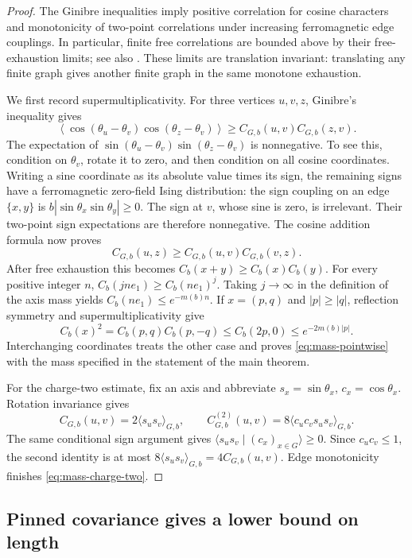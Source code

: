 \begin{proof}
The Ginibre inequalities \cite{Ginibre} imply positive correlation
for cosine characters and monotonicity of two-point correlations
under increasing ferromagnetic edge couplings.  In particular,
finite free correlations are bounded above by their free-exhaustion
limits; see also \cite[Lemma~16]{vEL}.  These limits are translation
invariant: translating any finite graph gives another finite graph
in the same monotone exhaustion.

We first record supermultiplicativity.  For three vertices \(u,v,z\),
Ginibre's inequality gives
\[
 \left\langle
 \cos(\theta_u-\theta_v)\cos(\theta_z-\theta_v)
 \right\rangle
 \ge C_{G,b}(u,v)C_{G,b}(z,v).
\]
The expectation of
\(\sin(\theta_u-\theta_v)\sin(\theta_z-\theta_v)\) is nonnegative.
To see this, condition on \(\theta_v\), rotate it to zero, and then
condition on all cosine coordinates.  Writing a sine coordinate
as its absolute value times its sign, the remaining signs have a
ferromagnetic zero-field Ising distribution: the sign coupling on
an edge \(\{x,y\}\) is
\(b|\sin\theta_x\sin\theta_y|\ge0\).
The sign at \(v\), whose sine is zero, is irrelevant.
Their two-point sign expectations are therefore nonnegative.
The cosine addition formula now proves
\[
               C_{G,b}(u,z)\ge C_{G,b}(u,v)C_{G,b}(v,z).
\]
After free exhaustion this becomes
\(C_b(x+y)\ge C_b(x)C_b(y)\).
For every positive integer \(n\),
\(C_b(jne_1)\ge C_b(ne_1)^j\).  Taking \(j\to\infty\) in the
definition of the axis mass yields
\(C_b(ne_1)\le e^{-m(b)n}\).
If \(x=(p,q)\) and \(|p|\ge|q|\), reflection symmetry and
supermultiplicativity give
\[
 C_b(x)^2=C_b(p,q)C_b(p,-q)\le C_b(2p,0)
                                      \le e^{-2m(b)|p|}.
\]
Interchanging coordinates treats the other case and proves
\eqref{eq:mass-pointwise} with the mass specified in the statement
of the main theorem.

For the charge-two estimate, fix an axis and abbreviate
\(s_x=\sin\theta_x\), \(c_x=\cos\theta_x\).
Rotation invariance gives
\[
 C_{G,b}(u,v)=2\langle s_us_v\rangle_{G,b},\qquad
 C^{(2)}_{G,b}(u,v)=8\langle c_uc_vs_us_v\rangle_{G,b}.
\]
The same conditional sign argument gives
\(\langle s_us_v\mid(c_x)_{x\in G}\rangle\ge0\).
Since \(c_uc_v\le1\), the second identity is at most
\(8\langle s_us_v\rangle_{G,b}=4C_{G,b}(u,v)\).
Edge monotonicity finishes \eqref{eq:mass-charge-two}.
\end{proof}

\subsection{Pinned covariance gives a lower bound on length}

